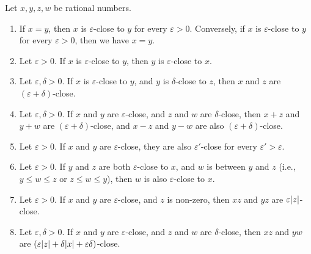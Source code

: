 \setcounter{theorem}{6}
\begin{proposition}\label{4.3.7}
Let \(x, y, z, w\) be rational numbers.
\begin{enumerate}
    \item If \(x = y\), then \(x\) is \(\varepsilon\)-close to \(y\) for every \(\varepsilon > 0\).
    Conversely, if \(x\) is \(\varepsilon\)-close to \(y\) for every \(\varepsilon > 0\), then we have \(x = y\).
    \item Let \(\varepsilon > 0\).
    If \(x\) is \(\varepsilon\)-close to \(y\), then \(y\) is \(\varepsilon\)-close to \(x\).
    \item Let \(\varepsilon, \delta > 0\).
    If \(x\) is \(\varepsilon\)-close to \(y\), and \(y\) is \(\delta\)-close to \(z\), then \(x\) and \(z\) are \((\varepsilon + \delta)\)-close.
    \item Let \(\varepsilon, \delta > 0\).
    If \(x\) and \(y\) are \(\varepsilon\)-close, and \(z\) and \(w\) are \(\delta\)-close, then \(x + z\) and \(y + w\) are \((\varepsilon + \delta)\)-close, and \(x - z\) and \(y - w\) are also \((\varepsilon + \delta)\)-close.
    \item Let \(\varepsilon > 0\).
    If \(x\) and \(y\) are \(\varepsilon\)-close, they are also \(\varepsilon'\)-close for every \(\varepsilon' > \varepsilon\).
    \item Let \(\varepsilon > 0\).
    If \(y\) and \(z\) are both \(\varepsilon\)-close to \(x\), and \(w\) is between \(y\) and \(z\) (i.e., \(y \leq w \leq z\) or \(z \leq w \leq y\)), then \(w\) is also \(\varepsilon\)-close to \(x\).
    \item Let \(\varepsilon > 0\).
    If \(x\) and \(y\) are \(\varepsilon\)-close, and \(z\) is non-zero, then \(xz\) and \(yz\) are \(\varepsilon\abs*{z}\)-close.
    \item Let \(\varepsilon, \delta > 0\).
    If \(x\) and \(y\) are \(\varepsilon\)-close, and \(z\) and \(w\) are \(\delta\)-close, then \(xz\) and \(yw\) are \((\varepsilon\abs*{z} + \delta\abs*{x} + \varepsilon\delta)\)-close.
\end{enumerate}
\end{proposition}

